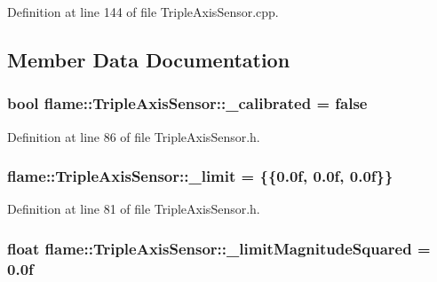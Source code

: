 Definition at line 144 of file Triple\-Axis\-Sensor.\-cpp.



\subsection{Member Data Documentation}
\hypertarget{classflame_1_1_triple_axis_sensor_af2a25fe4b795d8e4d48045f23d94a217}{
\subsubsection[{\-\_\-calibrated}]{\setlength{\rightskip}{0pt plus 5cm}bool flame\-::\-Triple\-Axis\-Sensor\-::\-\_\-calibrated = false\hspace{0.3cm}{\ttfamily [protected]}}}\label{classflame_1_1_triple_axis_sensor_af2a25fe4b795d8e4d48045f23d94a217}


Definition at line 86 of file Triple\-Axis\-Sensor.\-h.

\hypertarget{classflame_1_1_triple_axis_sensor_ac98b09ee7cf74d16a3f772752d7e1d30}{
\subsubsection[{\-\_\-limit}]{ flame\-::\-Triple\-Axis\-Sensor\-::\-\_\-limit = \{\{0.\-0f, 0.\-0f, 0.\-0f\}\}\hspace{0.3cm}{\ttfamily [protected]}}}\label{classflame_1_1_triple_axis_sensor_ac98b09ee7cf74d16a3f772752d7e1d30}


Definition at line 81 of file Triple\-Axis\-Sensor.\-h.

\hypertarget{classflame_1_1_triple_axis_sensor_a7e759ec01ad8d2d00038b2edf9fc5913}{
\subsubsection[{\-\_\-limit\-Magnitude\-Squared}]{\setlength{\rightskip}{0pt plus 5cm}float flame\-::\-Triple\-Axis\-Sensor\-::\-\_\-limit\-Magnitude\-Squared = 0.\-0f\hspace{0.3cm}{\ttfamily [protected]}}}\label{classflame_1_1_triple_axis_sensor_a7e759ec01ad8d2d00038b2edf9fc5913}


